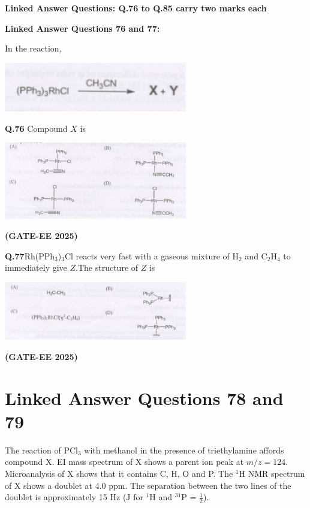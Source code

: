 \documentclass[12pt]{article}
\begin{document}
\begin{enumerate}
\textbf{Linked Answer Questions: Q.76 to Q.85 carry two marks each}

\textbf{Linked Answer Questions 76 and 77:}

In the reaction,

\begin{center}
\includegraphics[width=0.6\textwidth]{q76 1.png}
\end{center}

\textbf{Q.76} Compound $X$ is

\begin{center}
\includegraphics[width=0.6\textwidth]{q76 2.png}
\end{center}   \textbf{(GATE-EE 2025)}


\textbf{Q.77}Rh(PPh$_3$)$_3$Cl reacts very fast with a gaseous mixture of H$_2$ and C$_2$H$_4$ to immediately give $Z$.The structure of $Z$ is

\begin{center}
\includegraphics[width=0.6\textwidth]{q77.png}
\end{center}   \textbf{(GATE-EE 2025)}


\section*{Linked Answer Questions 78 and 79}

The reaction of PCl$_3$ with methanol in the presence of triethylamine affords compound X. EI mass spectrum of X shows a parent ion peak at $m/z = 124$. Microanalysis of X shows that it contains C, H, O and P. The $^1$H NMR spectrum of X shows a doublet at 4.0 ppm. The separation between the two lines of the doublet is approximately 15 Hz (J for $^1$H and $^{31}$P = $\tfrac{1}{2}$).


\end{enumerate}
\end{document}
